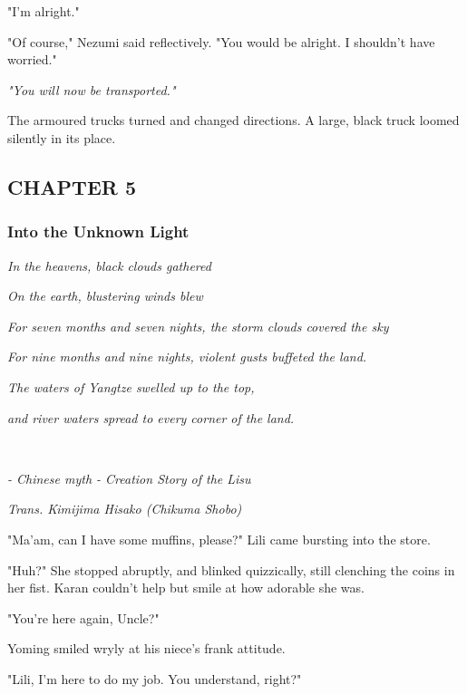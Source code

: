 "I'm alright."

"Of course," Nezumi said reflectively. "You would be alright. I
shouldn't have worried."

\emph{"You will now be transported."}

The armoured trucks turned and changed directions. A large, black truck
loomed silently in its place.

\hypertarget{index_split_083.htmlux5cux23calibre_pb_115}{}

\protect\hypertarget{index_split_112.html}{}{}

\hypertarget{index_split_112.htmlux5cux23calibre_pb_0}{}

\hypertarget{index_split_112.htmlux5cux23calibre_toc_6}{%
\subsection{CHAPTER 5}\label{index_split_112.htmlux5cux23calibre_toc_6}}

\subsubsection{Into the Unknown Light}

\emph{In the heavens, black clouds gathered}

\emph{On the earth, blustering winds blew}

\emph{For seven months and seven nights, the storm clouds covered the
sky}

\emph{For nine months and nine nights, violent gusts buffeted the land.}

\emph{The waters of Yangtze swelled up to the top,}

\emph{and river waters spread to every corner of the land.}

\emph{\\
}

\emph{- Chinese myth - Creation Story of the Lisu}

\emph{Trans. Kimijima Hisako (Chikuma Shobo)}

"Ma'am, can I have some muffins, please?" Lili came bursting into the
store.

"Huh?" She stopped abruptly, and blinked quizzically, still clenching
the coins in her fist. Karan couldn't help but smile at how adorable she
was.

"You're here again, Uncle?"

Yoming smiled wryly at his niece's frank attitude.

"Lili, I'm here to do my job. You understand, right?"~

